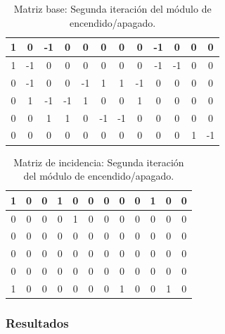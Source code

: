 \begin{table}[H]
    \centering
    \begin{tabular}{|c|c|c|c|c|c|c|c|c|c|c|c|}
        \hline
        1 & 0  & -1 & 0  & \cellcolor{lightgray}0  & 0  & 0  & 0  & -1 & 0  & 0 & 0  \\
        \hline
        1 & -1 & 0  & 0  & \cellcolor{lightgray}0  & 0  & 0  & 0  & -1 & -1 & 0 & 0  \\
        \hline
        0 & -1 & 0  & 0  & \cellcolor{lightgray}-1 & 1  & 1  & -1 & 0  & 0  & 0 & 0  \\
        \hline
        0 & 1  & -1 & -1 & \cellcolor{lightgray}1  & 0  & 0  & 1  & 0  & 0  & 0 & 0  \\
        \hline
        0 & 0  & 1  & 1  & \cellcolor{lightgray}0  & -1 & -1 & 0  & 0  & 0  & 0 & 0  \\
        \hline
        0 & 0  & 0  & 0  & \cellcolor{lightgray}0  & 0  & 0  & 0  & 0  & 0  & 1 & -1 \\
        \hline
    \end{tabular}
    \caption{Matriz base: Segunda iteración del módulo de encendido/apagado.}
    \label{tabla:matriz_base_post_2}
\end{table}

\begin{table}[H]
    \centering
    \begin{tabular}{|c|c|c|c|c|c|c|c|c|c|c|c|}
        \hline
        1 & 0 & 0 & 1 & \cellcolor{lightgray}0 & 0 & 0 & 0 & 0 & 1 & 0 & 0 \\
        \hline
        0 & 0 & 0 & 0 & \cellcolor{lightgray}1 & 0 & 0 & 0 & 0 & 0 & 0 & 0 \\
        \hline
        0 & 0 & 0 & 0 & \cellcolor{lightgray}0 & 0 & 0 & 0 & 0 & 0 & 0 & 0 \\
        \hline
        0 & 0 & 0 & 0 & \cellcolor{lightgray}0 & 0 & 0 & 0 & 0 & 0 & 0 & 0 \\
        \hline
        0 & 0 & 0 & 0 & \cellcolor{lightgray}0 & 0 & 0 & 0 & 0 & 0 & 0 & 0 \\
        \hline
        1 & 0 & 0 & 0 & \cellcolor{lightgray}0 & 0 & 0 & 1 & 0 & 0 & 1 & 0 \\
        \hline
    \end{tabular}
    \caption{Matriz de incidencia: Segunda iteración del módulo de encendido/apagado.}
    \label{tabla:matriz_incidencia_post_2}
\end{table}

\subsubsection{Resultados}

